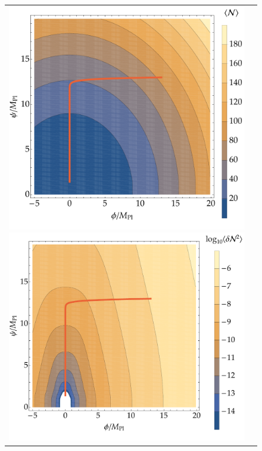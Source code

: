 \documentclass[aps, prd
, preprint
, nofootinbib 
, longbibliography
]{revtex4-1}
\begin{document}
\begin{figure}
	\centering
	\begin{tabular}{cc}
		\begin{minipage}{0.5\hsize}
			\centering
			\includegraphics[width=0.9\hsize]{figs/double_chaotic/N_conf.pdf}
		\end{minipage}
		\begin{minipage}{0.5\hsize}
			\centering
			\includegraphics[width=0.9\hsize]{figs/double_chaotic/dN2_conf.pdf}
		\end{minipage}
	\end{tabular} \\[10pt]

\end{figure}
\end{document}
